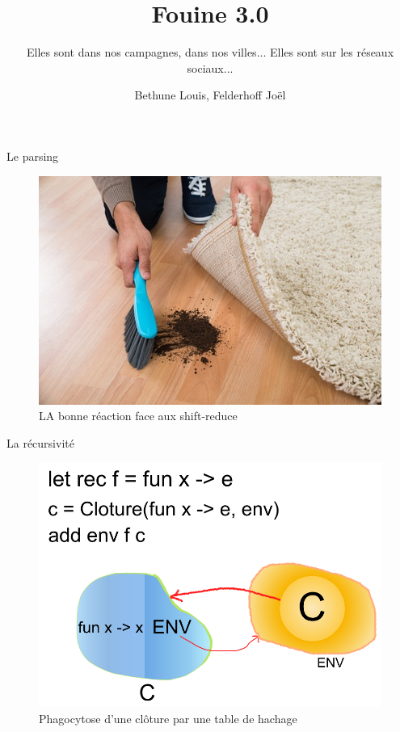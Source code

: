 \documentclass[pdf]{beamer}
\title{Fouine 3.0}
\subtitle{Elles sont dans nos campagnes, dans nos villes... Elles sont sur les réseaux sociaux... }
\author{Bethune Louis, Felderhoff Joël}
\begin{document}
\begin{frame}
\titlepage
\end{frame}

\begin{frame}{Le parsing}
\begin{figure}
\center
\includegraphics[scale=0.7]{les-petits-tas-de-poussiere-sous-nos-tapis.jpg} 
\caption {LA bonne réaction face aux shift-reduce}
\end{figure}
\end{frame}


\begin{frame}{La récursivité}
\begin{figure}
\center
\includegraphics[scale=0.3]{Drawing.png} 
\caption {Phagocytose d'une clôture par une table de hachage}
\end{figure}
\end{frame}
\end{document}
